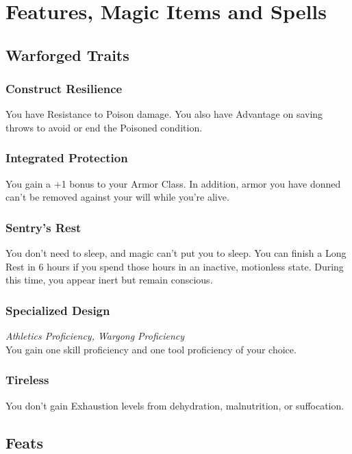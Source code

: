 \documentclass[letterpaper,openany,oneside,twocolumn]{book}
\begin{document}
\onecolumn


\rendercharactersheet

\renderbackgroundsheet

\renderspellsheet

\restoregeometry
\twocolumn

\chapter*{Features, Magic Items and Spells}

\section*{Warforged Traits}
\subsection*{Construct Resilience}
You have Resistance to Poison damage. You also have Advantage on saving throws to avoid or end the Poisoned condition.
\subsection*{Integrated Protection}
You gain a +1 bonus to your Armor Class. In addition, armor you have donned can't be removed against your will while you're alive.
\subsection*{Sentry's Rest}
You don't need to sleep, and magic can't put you to sleep. You can finish a Long Rest in 6 hours if you spend those hours in an inactive, motionless state. During this time, you appear inert but remain conscious.
\subsection*{Specialized Design}
\textit{Athletics Proficiency, Wargong Proficiency}\\
You gain one skill proficiency and one tool proficiency of your choice.
\subsection*{Tireless}
You don't gain Exhaustion levels from dehydration, malnutrition, or suffocation.

\section*{Feats}
\end{document}
